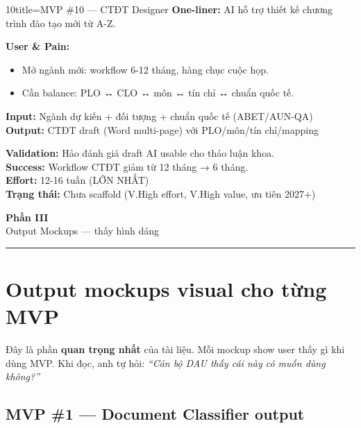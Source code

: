 \documentclass[11pt,a4paper]{article}
\begin{document}
\begin{mvpbox}{10}{title=MVP \#10 — CTĐT Designer}
\textbf{One-liner:} AI hỗ trợ thiết kế chương trình đào tạo mới từ A-Z.

\textbf{User \& Pain:}
\begin{itemize}
\item Mở ngành mới: workflow 6-12 tháng, hàng chục cuộc họp.
\item Cần balance: PLO ↔ CLO ↔ môn ↔ tín chỉ ↔ chuẩn quốc tế.
\end{itemize}

\textbf{Input:} Ngành dự kiến + đối tượng + chuẩn quốc tế (ABET/AUN-QA)\\
\textbf{Output:} CTĐT draft (Word multi-page) với PLO/môn/tín chỉ/mapping

\textbf{Validation:} Hảo đánh giá draft AI usable cho thảo luận khoa.\\
\textbf{Success:} Workflow CTĐT giảm từ 12 tháng → 6 tháng.\\
\textbf{Effort:} 12-16 tuần (LỚN NHẤT)\\
\textbf{Trạng thái:} Chưa scaffold (V.High effort, V.High value, ưu tiên 2027+)
\end{mvpbox}

\clearpage

\begin{center}
\vspace*{0.5em}
{\sffamily\bfseries\Huge\color{outputcolor} Phần III}\\[0.5em]
{\sffamily\LARGE\color{mid} Output Mockups --- thấy hình dáng}\\[0.5em]
{\color{outputcolor}\rule{6cm}{0.4pt}}
\end{center}
\vspace{1em}

\section{Output mockups visual cho từng MVP}

Đây là phần \textbf{quan trọng nhất} của tài liệu. Mỗi mockup show user thấy gì khi
dùng MVP. Khi đọc, anh tự hỏi: \textit{``Cán bộ DAU thấy cái này có muốn dùng không?''}

\subsection{MVP \#1 — Document Classifier output}
\end{document}

